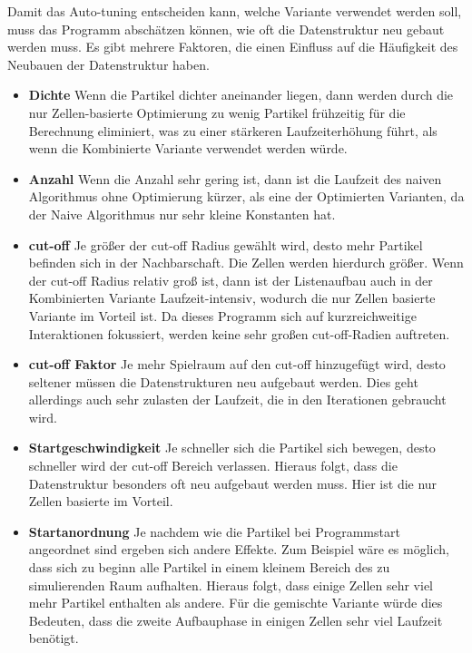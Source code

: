 \documentclass[
	12pt,
	a4paper,
	BCOR10mm,
	DIV14,
	headsepline,
]{scrreprt}
\begin{document}
Damit das Auto-tuning entscheiden kann, welche Variante verwendet werden soll, muss das Programm abschätzen können, wie oft die Datenstruktur neu gebaut werden muss. Es gibt mehrere Faktoren, die einen Einfluss auf die Häufigkeit des Neubauen der Datenstruktur haben.
\begin{itemize}
	\item \textbf{Dichte} Wenn die Partikel dichter aneinander liegen, dann werden durch die nur Zellen-basierte Optimierung zu wenig Partikel frühzeitig für die Berechnung eliminiert, was zu einer stärkeren Laufzeiterhöhung führt, als wenn die Kombinierte Variante verwendet werden würde.
	\item \textbf{Anzahl} Wenn die Anzahl sehr gering ist, dann ist die Laufzeit des naiven Algorithmus ohne Optimierung kürzer, als eine der Optimierten Varianten, da der Naive Algorithmus nur sehr kleine Konstanten hat.
	\item \textbf{cut-off} Je größer der cut-off Radius gewählt wird, desto mehr Partikel befinden sich in der Nachbarschaft. Die Zellen werden hierdurch größer. Wenn der cut-off Radius relativ groß ist, dann ist der Listenaufbau auch in der Kombinierten Variante Laufzeit-intensiv, wodurch die nur Zellen basierte Variante im Vorteil ist. Da dieses Programm sich auf kurzreichweitige Interaktionen fokussiert, werden keine sehr großen cut-off-Radien auftreten.
	\item \textbf{cut-off Faktor} Je mehr Spielraum auf den cut-off hinzugefügt wird, desto seltener müssen die Datenstrukturen neu aufgebaut werden. Dies geht allerdings auch sehr zulasten der Laufzeit, die in den Iterationen gebraucht wird.
	\item \textbf{Startgeschwindigkeit} Je schneller sich die Partikel sich bewegen, desto schneller wird der cut-off Bereich verlassen. Hieraus folgt, dass die Datenstruktur besonders oft neu aufgebaut werden muss. Hier ist die nur Zellen basierte im Vorteil.
	\item \textbf{Startanordnung} Je nachdem wie die Partikel bei Programmstart angeordnet sind ergeben sich andere Effekte. Zum Beispiel wäre es möglich, dass sich zu beginn alle Partikel in einem kleinem Bereich des zu simulierenden Raum aufhalten. Hieraus folgt, dass einige Zellen sehr viel mehr Partikel enthalten als andere. Für die gemischte Variante würde dies Bedeuten, dass die zweite Aufbauphase in einigen Zellen sehr viel Laufzeit benötigt.
\end{itemize}
\end{document}
